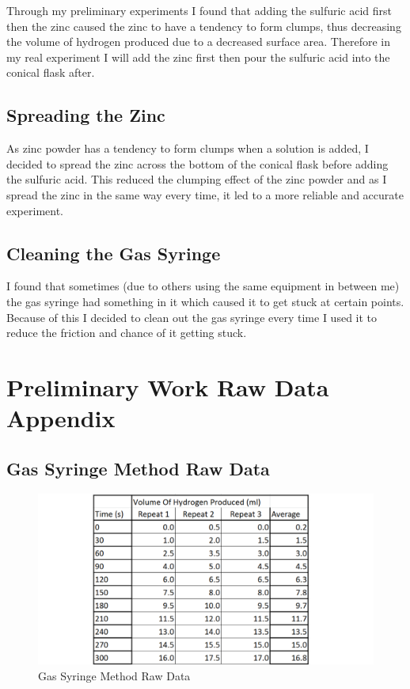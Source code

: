 Through my preliminary experiments I found that adding the sulfuric acid first then the zinc caused the zinc to have a tendency to form clumps, thus decreasing the volume of hydrogen produced due to a decreased surface area. Therefore in my real experiment I will add the zinc first then pour the sulfuric acid into the conical flask after.

	\subsection{Spreading the Zinc}

As zinc powder has a tendency to form clumps when a solution is added, I decided to spread the zinc across the bottom of the conical flask before adding the sulfuric acid. This reduced the clumping effect of the zinc powder and as I spread the zinc in the same way every time, it led to a more reliable and accurate experiment.

	\subsection{Cleaning the Gas Syringe}

I found that sometimes (due to others using the same equipment in between me) the gas syringe had something in it which caused it to get stuck at certain points. Because of this I decided to clean out the gas syringe every time I used it to reduce the friction and chance of it getting stuck.


\section{Preliminary Work Raw Data Appendix}

\subsection{Gas Syringe Method Raw Data}
\begin{figure}[H]
    \includegraphics[width=\textwidth]{./preliminarywork/images/GasSyringeRawData.pdf}
    \caption{Gas Syringe Method Raw Data} \label{fig:GasSyringeRawData}
\end{figure}

